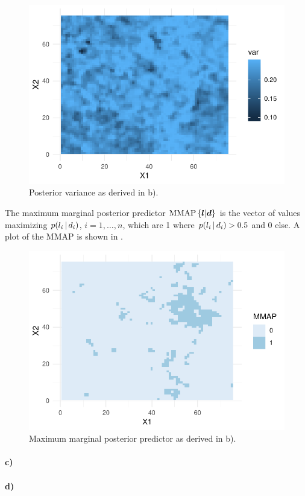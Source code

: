 \begin{figure}
    \centering
    \includegraphics{figures/b_var.pdf}
    \caption{Posterior variance as derived in b).}
    \label{fig:b_var}
\end{figure}

The maximum marginal posterior predictor $\text{MMAP}\left\{\bm{l}|\bm{d}\right\}$ is the vector of values maximizing $p(l_i \, | \, d_i)$, $i = 1, \dots, n$, which are 1 where $p(l_i \, | \, d_i) > 0.5$ and 0 else. A plot of the MMAP is shown in .

\begin{figure}
    \centering
    \includegraphics{figures/b_mmap.pdf}
    \caption{Maximum marginal posterior predictor as derived in b).}
    \label{fig:b_mmap}
\end{figure}

\paragraph{c)}


\paragraph{d)}

